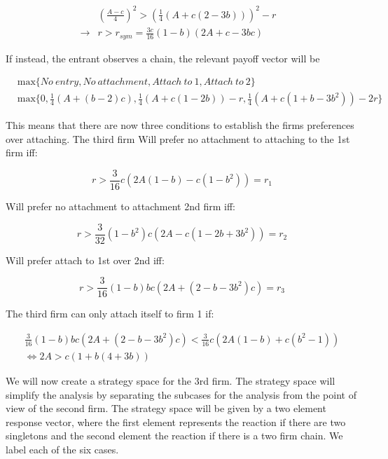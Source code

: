 \documentclass{article}
\begin{document}
\begin{align*}
& \left(\frac{A-c}{4}\right)^2> \left(\frac{1}{4}(A+c(2-3b))\right)^2-r & \\
\rightarrow 
& r> r_{sym} = \frac{3c}{16}(1-b)(2A+c-3bc) &
\end{align*}

If instead, the entrant observes a chain, the relevant payoff vector will be

\begin{align*}
& \text{max} \{No~ entry, No~ attachment, Attach ~to ~1, Attach~ to~ 2 \} &\\
& \text{max} \{
0,
\frac{1}{4}(A+(b-2)c), \frac{1}{4} (A+c(1-2b))-r, \frac{1}{4}(A+c(1+b-3b^2))-2r \} &
\end{align*}

This means that there are now three conditions to establish the firms preferences over attaching. The third firm Will prefer no attachment to attaching to the 1st firm iff:

\begin{equation*}
r> \frac{3}{16} c \left(2 A (1-b)-c(1-b^2 ) \right) = r_1
\end{equation*}

Will prefer no attachment to attachment 2nd firm iff:

\begin{equation*}
r > \frac{3}{32} \left(1-b^2\right) c \left(2 A-c(1-2b+3 b^2) \right) = r_2
\end{equation*}


Will prefer attach to 1st over 2nd iff:

\begin{equation*}
r > \frac{3}{16} (1 - b) b c (2 A + (2 - b - 3 b^2) c) = r_3
\end{equation*}


The third firm can only attach itself to firm 1 if:

\begin{align*}
\frac{3}{16} (1 - b) b c (2 A + (2 - b - 3 b^2) c)<\frac{3}{16} c \left(2 A (1-b)+c(b^2 -1) \right) \\ 
\Leftrightarrow 
2A>c(1+b(4+3b))
\end{align*}

We will now create a strategy space for the 3rd firm. The strategy space will simplify the analysis by separating the subcases for the analysis from the point of view of the second firm. The strategy space will be given by a two element response vector, where the first element represents the reaction if there are two singletons and the second element the reaction if there is a two firm chain. We label each of the six cases. 
\end{document}
